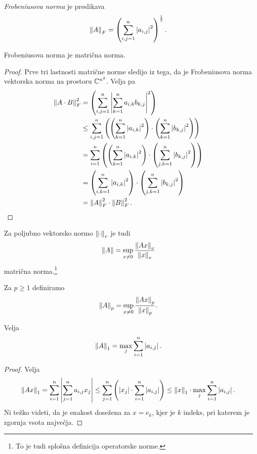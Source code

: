 \begin{definicija}
\emph{Frobeniusova norma} je preslikava
\[
\left\lVert A\right\rVert_F = \left(\sum_{i,j=1}^n \left\lvert a_{i,j}\right\rvert^2\right)^{\frac{1}{2}}.
\]
\end{definicija}

\begin{trditev}
Frobeniusova norma je matrična norma.
\end{trditev}

\begin{proof}
Prve tri lastnosti matrične norme sledijo iz tega, da je
Frobeniusova norma vektorska norma na prostoru $\mathbb{C}^{n^2}$. Velja pa
\begin{align*}
\left\lVert A \cdot B\right\rVert_F^2 &=
\left(\sum_{i,j=1}^n \left\lvert \sum_{k=1}^n a_{i,k} b_{k,j}\right\rvert^2\right)
\\
&\leq
\sum_{i,j=1}^n \left(\left(\sum_{k=1}^n \left\lvert a_{i,k}\right\rvert^2\right) \cdot
\left(\sum_{k=1}^n \left\lvert b_{k,j}\right\rvert^2\right)\right)
\\
&=
\sum_{i=1}^n \left(\left(\sum_{k=1}^n \left\lvert a_{i,k}\right\rvert^2\right) \cdot
\left(\sum_{j,k=1}^n \left\lvert b_{k,j}\right\rvert^2\right)\right)
\\
&=
\left(\sum_{i,k=1}^n \left\lvert a_{i,k}\right\rvert^2\right) \cdot
\left(\sum_{j,k=1}^n \left\lvert b_{k,j}\right\rvert^2\right)
\\
&=
\left\lVert A\right\rVert_F^2 \cdot \left\lVert B\right\rVert_F^2.
\qedhere
\end{align*}
\end{proof}

\begin{trditev}
Za poljubno vektorsko normo $\left\lVert \cdot\right\rVert_v$ je tudi
\[
\left\lVert A\right\rVert = \sup_{x \ne 0} \frac{\left\lVert Ax\right\rVert_v}{\left\lVert x\right\rVert_v}
\]
matrična norma.\footnote{To je tudi splošna definicija operatorske
norme.}
\end{trditev}

\obvs

\begin{definicija}
Za $p \geq 1$ definiramo
\[
\left\lVert A\right\rVert_p = \sup_{x \ne 0} \frac{\left\lVert Ax\right\rVert_p}{\left\lVert x\right\rVert_p}.
\]
\end{definicija}

\begin{trditev}
Velja
\[
\left\lVert A\right\rVert_1 = \max_j \sum_{i=1}^n \left\lvert a_{i,j}\right\rvert.
\]
\end{trditev}

\begin{proof}
Velja
\[
\left\lVert Ax\right\rVert_1 =
\sum_{i=1}^n \left\lvert \sum_{j=1}^n a_{i,j} x_j\right\rvert \leq
\sum_{j=1}^n \left(\left\lvert x_j\right\rvert \cdot \sum_{i=1}^n \left\lvert a_{i,j}\right\rvert\right) \leq
\left\lVert x\right\rVert_1 \cdot \max_j \sum_{i=1}^n \left\lvert a_{i,j}\right\rvert.
\]
Ni težko videti, da je enakost dosežena za $x = e_k$, kjer je $k$
indeks, pri katerem je zgornja vsota največja.
\end{proof}


